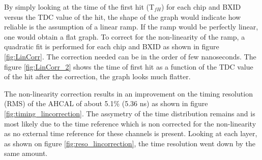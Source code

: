 By simply looking at the time of the first hit (T$_{fH}$) for each chip and BXID versus the TDC value of the hit, the shape of the graph would indicate how reliable is the assumption of a linear ramp. If the ramp would be perfectly linear, one would obtain a flat graph. To correct for the non-linearity of the ramp, a quadratic fit is performed for each chip and BXID as shown in figure \ref{fig:LinCorr}. The correction needed can be in the order of few nanoseconds. The figure \ref{fig:LinCorr_2} shows the time of first hit as a function of the TDC value of the hit after the correction, the graph looks much flatter.

The non-linearity correction results in an improvement on the timing resolution (RMS) of the AHCAL of about 5.1\% (5.36 ns) as shown in figure \ref{fig:timing_lincorrection}. The assymetry of the time distribution remains and is most likely due to the time reference which is non corrected for the non-linearity as no external time reference for these channels is present. Looking at each layer, as shown on figure \ref{fig:reso_lincorrection}, the time resolution went down by the same amount.

